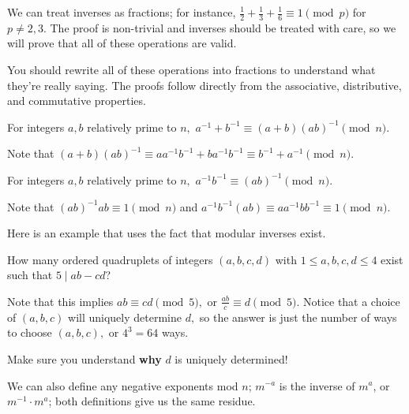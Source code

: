\documentclass[mast]{lucky}
\begin{document}
We can treat inverses as fractions; for instance, $\frac{1}{2}+\frac{1}{3}+\frac{1}{6}\equiv 1\pmod{p}$ for $p\neq 2,3.$ The proof is non-trivial and inverses should be treated with care, so we will prove that all of these operations are valid.

You should rewrite all of these operations into fractions to understand what they're really saying. The proofs follow directly from the associative, distributive, and commutative properties.

\begin{fact}
For integers $a,b$ relatively prime to $n,$ $a^{-1}+b^{-1}\equiv (a+b)(ab)^{-1}\pmod{n}.$
\end{fact}

\begin{pro}
Note that $(a+b)(ab)^{-1}\equiv aa^{-1}b^{-1}+ba^{-1}b^{-1}\equiv b^{-1}+a^{-1}\pmod{n}.$
\end{pro}

\begin{fact}
For integers $a,b$ relatively prime to $n,$ $a^{-1}b^{-1}\equiv(ab)^{-1}\pmod{n}.$
\end{fact}

\begin{pro}
Note that $(ab)^{-1}ab\equiv 1\pmod{n}$ and $a^{-1}b^{-1}(ab)\equiv aa^{-1}bb^{-1}\equiv 1\pmod{n}.$
\end{pro}

Here is an example that uses the fact that modular inverses exist.

\begin{exam}
How many ordered quadruplets of integers $(a,b,c,d)$ with $1\leq a,b,c,d\leq 4$ exist such that $5\mid ab-cd$?
\end{exam}

\begin{sol}
Note that this implies $ab\equiv cd\pmod{5},$ or $\frac{ab}{c}\equiv d\pmod{5}.$ Notice that a choice of $(a,b,c)$ will uniquely determine $d,$ so the answer is just the number of ways to choose $(a,b,c),$ or $4^3=64$ ways.
\end{sol}

Make sure you understand \textbf{why} $d$ is uniquely determined!

\begin{fact}
We can also define any negative exponents mod $n$; $m^{-a}$ is the inverse of $m^a$, or $m^{-1}\cdot m^a$; both definitions give us the same residue.
\end{fact}
\end{document}
